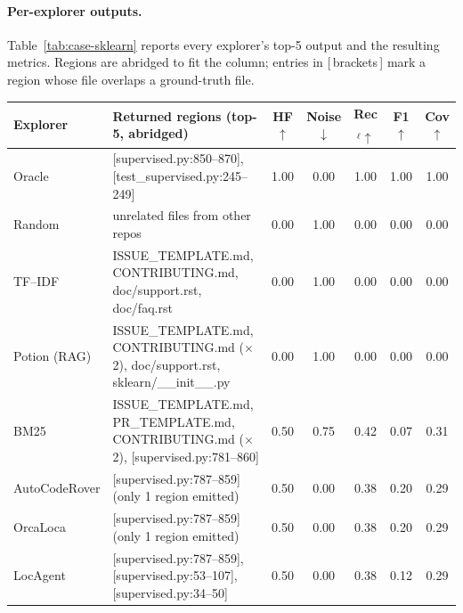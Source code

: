 \documentclass{llmxive}
\begin{document}
\paragraph{Per-explorer outputs.}
Table~\ref{tab:case-sklearn} reports every explorer's top-5 output and the resulting metrics. Regions are abridged to fit the column; entries in [\,brackets\,] mark a region whose file overlaps a ground-truth file.

\begin{table}[!htbp]
\centering
\small
\setlength{\tabcolsep}{4pt}
\begin{tabular}{l p{6.6cm} ccccc}
\toprule
Explorer & Returned regions (top-5, abridged) & HF$\uparrow$ & Noise$\downarrow$ & Rec$_\ell\uparrow$ & F1$\uparrow$ & Cov$\uparrow$ \\
\midrule
Oracle         & [supervised.py:850--870], [test\_supervised.py:245--249]                                                                       & 1.00 & 0.00 & 1.00 & 1.00 & 1.00 \\
\midrule
Random         & unrelated files from other repos                                                                                              & 0.00 & 1.00 & 0.00 & 0.00 & 0.00 \\
TF--IDF        & ISSUE\_TEMPLATE.md, CONTRIBUTING.md, doc/support.rst, doc/faq.rst                                                              & 0.00 & 1.00 & 0.00 & 0.00 & 0.00 \\
Potion (RAG)   & ISSUE\_TEMPLATE.md, CONTRIBUTING.md ($\times$2), doc/support.rst, sklearn/\_\_init\_\_.py                                       & 0.00 & 1.00 & 0.00 & 0.00 & 0.00 \\
BM25           & ISSUE\_TEMPLATE.md, PR\_TEMPLATE.md, CONTRIBUTING.md ($\times$2), [supervised.py:781--860]                                     & 0.50 & 0.75 & 0.42 & 0.07 & 0.31 \\
\midrule
AutoCodeRover  & [supervised.py:787--859]  (only 1 region emitted)                                                                              & 0.50 & 0.00 & 0.38 & 0.20 & 0.29 \\
OrcaLoca       & [supervised.py:787--859]  (only 1 region emitted)                                                                              & 0.50 & 0.00 & 0.38 & 0.20 & 0.29 \\
LocAgent       & [supervised.py:787--859], [supervised.py:53--107], [supervised.py:34--50]                                                      & 0.50 & 0.00 & 0.38 & 0.12 & 0.29 \\

\end{tabular}
\end{table}
\end{document}
